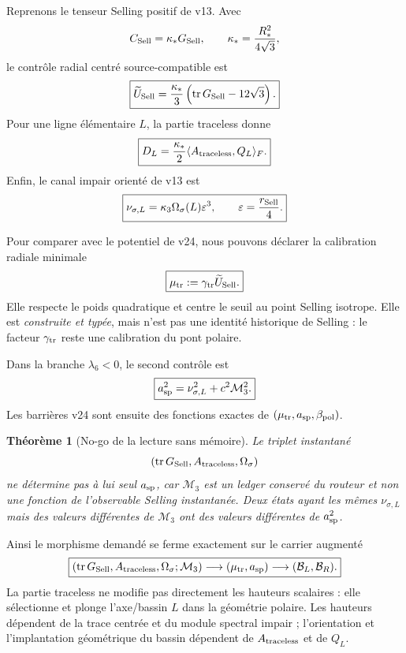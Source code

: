 \documentclass[11pt,a4paper]{article}
\newtheorem{theorem}{Théorème}[section]
\begin{document}
Reprenons le tenseur Selling positif de v13. Avec
\[
 C_{\rm Sell}=\kappa_*G_{\rm Sell},
 \qquad
 \kappa_*={R_*^2\over4\sqrt3},
\]
le contrôle radial centré source-compatible est
\begin{equation}\label{eq:v25-Utrace}
 \boxed{
 \widetilde U_{\rm Sell}
 =
 {\kappa_*\over3}
 \left(
 \operatorname{tr}G_{\rm Sell}-12\sqrt3
 \right).}
\end{equation}
Pour une ligne élémentaire $L$, la partie traceless donne
\begin{equation}\label{eq:v25-Dreadout}
 \boxed{
 D_L
 =
 {\kappa_*\over2}
 \langle A_{\rm traceless},Q_L\rangle_F.}
\end{equation}
Enfin, le canal impair orienté de v13 est
\begin{equation}\label{eq:v25-nureadout}
 \boxed{
 \nu_{\sigma,L}
 =
 \kappa_3\Omega_\sigma(L)\varepsilon^3,
 \qquad
 \varepsilon={r_{\rm Sell}\over4}.}
\end{equation}

Pour comparer avec le potentiel de v24, nous pouvons déclarer la calibration radiale minimale
\begin{equation}\label{eq:v25-mu-trace-adapter}
 \boxed{
 \mu_{\rm tr}
 :=
 \gamma_{\rm tr}\widetilde U_{\rm Sell}.}
\end{equation}
Elle respecte le poids quadratique et centre le seuil au point Selling isotrope. Elle est \emph{construite et typée}, mais n'est pas une identité historique de Selling : le facteur $\gamma_{\rm tr}$ reste une calibration du pont polaire.

Dans la branche $\lambda_6<0$, le second contrôle est
\begin{equation}\label{eq:v25-a-readout}
 \boxed{
 a_{\rm sp}^2
 =
 \nu_{\sigma,L}^2+c^2\mathcal M_3^2.}
\end{equation}
Les barrières v24 sont ensuite des fonctions exactes de $(\mu_{\rm tr},a_{\rm sp},\beta_{\rm pol})$.

\begin{theorem}[No-go de la lecture sans mémoire]
Le triplet instantané
\[
 \left(
 \operatorname{tr}G_{\rm Sell},
 A_{\rm traceless},
 \Omega_\sigma
 \right)
\]
ne détermine pas à lui seul $a_{\rm sp}$, car $\mathcal M_3$ est un ledger conservé du routeur et non une fonction de l'observable Selling instantanée. Deux états ayant les mêmes $\nu_{\sigma,L}$ mais des valeurs différentes de $\mathcal M_3$ ont des valeurs différentes de $a_{\rm sp}^2$.
\end{theorem}

Ainsi le morphisme demandé se ferme exactement sur le carrier augmenté
\begin{equation}\label{eq:v25-augmented-barrier-map}
 \boxed{
 \left(
 \operatorname{tr}G_{\rm Sell},
 A_{\rm traceless},
 \Omega_\sigma;\mathcal M_3
 \right)
 \longrightarrow
 (\mu_{\rm tr},a_{\rm sp})
 \longrightarrow
 (\mathcal B_L,\mathcal B_R).}
\end{equation}
La partie traceless ne modifie pas directement les hauteurs scalaires : elle sélectionne et plonge l'axe/bassin $L$ dans la géométrie polaire. Les hauteurs dépendent de la trace centrée et du module spectral impair ; l'orientation et l'implantation géométrique du bassin dépendent de $A_{\rm traceless}$ et de $Q_L$.
\end{document}
